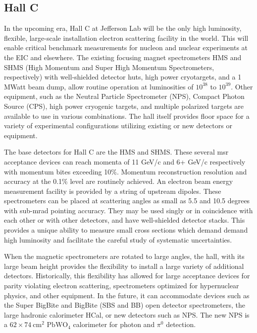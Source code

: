 \subsection{Hall C}
\label{sec:app-hallc}


In the upcoming era, Hall C at Jefferson Lab will
be the only high luminosity, flexible, large-scale installation
electron scattering facility in the world. This will enable critical benchmark measurements for nucleon and nuclear experiments at the EIC and elsewhere. The existing focusing magnet spectrometers HMS and SHMS (High Momentum and Super High Momentum Spectrometers, respectively) with well-shielded detector huts, high power cryotargets, and a 1 MWatt beam dump, allow routine operation at luminosities of $10^{38}$ to $10^{39}$.
Other equipment, such as the Neutral Particle Spectrometer (NPS), Compact Photon Source (CPS), high power cryogenic targets, and multiple
polarized targets are available to use in various combinations.  The hall itself provides floor space for a variety of
experimental configurations utilizing existing or new detectors or
equipment.

The base detectors for Hall C are the HMS and SHMS. These several msr acceptance devices can reach momenta of 11 GeV/c and 6+ GeV/c respectively  with momentum bites exceeding 10\%. 
Momentum reconstruction resolution and accuracy at the 0.1\% level are routinely achieved.
An electron beam energy measurement facility is provided by a string of upstream dipoles. These spectrometers can be placed at scattering angles as small as 5.5
and 10.5 degrees with sub-mrad pointing accuracy. They may be used singly or in
coincidence with each other or with other detectors, and have well-shielded
detector stacks.  This provides a unique ability to measure small
cross sections which demand demand high luminosity and facilitate the
careful study of systematic uncertainties.

When the magnetic spectrometers are rotated to large angles, the hall,
with its large beam height provides the flexibility to install a
large variety of additional detectors.  Historically, this flexibility
has allowed for large acceptance devices for parity violating
electron scattering, spectrometers optimized for hypernuclear physics, 
and other equipment. In the future, it can accommodate devices such as
the Super BigBite and BigBite (SBS and BB) open detector
spectrometers, the large hadronic calorimeter HCal, or new detectors such as NPS. The new NPS is a $62\times74~\textrm{cm}^2$
$\textrm{PbWO}_4$ calorimeter for photon and $\pi^0$ detection.

